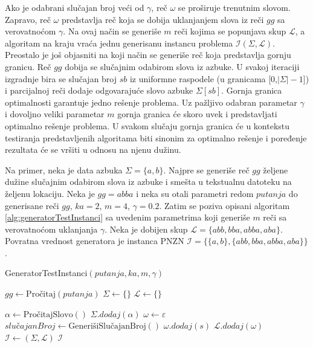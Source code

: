 \documentclass[12pt,oneside]{memoir}
\begin{document}
Ako je odabrani slučajan broj veći od $\gamma$, reč $\omega$ se proširuje
trenutnim slovom. Zapravo, reč $\omega$ predstavlja reč koja se dobija uklanjanjem slova iz 
reči $gg$ sa verovatnoćom $\gamma$.
Na ovaj način se generiše $m$ reči kojima se popunjava skup $\mathcal{L}$, a algoritam
na kraju vraća jednu generisanu instancu problema $\mathcal{I}(\Sigma,\mathcal{L})$.
Preostalo je još objasniti na koji način se generiše reč koja predstavlja gornju granicu.
Reč $gg$ dobija se slučajnim odabirom slova iz azbuke. U svakoj iteraciji 
izgradnje bira se slučajan broj $sb$ iz uniformne
raspodele (u granicama [0,$|\Sigma|-1$]) i parcijalnoj reči dodaje 
odgovarajuće slovo azbuke $\Sigma[sb]$.
Gornja granica optimalnosti garantuje jedno rešenje problema. Uz pažljivo odabran parametar
$\gamma$ i dovoljno veliki parametar $m$ gornja granica će skoro uvek i predstavljati
optimalno rešenje problema. U svakom slučaju gornja granica će u kontekstu testiranja
predstavljenih algoritama biti sinonim za optimalno rešenje i poređenje rezultata će se
vršiti u odnosu na njenu dužinu.

Na primer, neka je data azbuka $\Sigma=\{a,b\}$. Najpre se generiše reč $gg$ željene
dužine slučajnim odabirom slova iz azbuke i smešta u tekstualnu datoteku 
na željenu lokaciju. Neka je $gg=abba$ i neka su otali parametri redom
$putanja$ do generisane reči $gg$, $ka=2$, $m=4$, $\gamma=0.2$.
Zatim se poziva opisani algoritam \ref{alg:generatorTestInstanci} sa uvedenim
parametrima koji generiše $m$ reči sa verovatnoćom uklanjanja $\gamma$. Neka je dobijen skup
$\mathcal{L}=\{abb,bba,abba,aba\}$. Povratna vrednost generatora je instanca PNZN
$\mathcal{I}=\{\{a,b\}, \{abb,bba,abba,aba\}\}$.
\begin{algorithm}
  \caption{\textrm{GeneratorTestInstanci}$(putanja,ka,m,\gamma)$}
  \label{alg:generatorTestInstanci}
  \begin{algorithmic}[1]
  \State $gg \gets \textrm{Pročitaj}(putanja)$ 
  \State $\Sigma \gets \{\}$
  \State $\mathcal{L} \gets \{\}$
  \State

    \State $\alpha \gets \textrm{PročitajSlovo}()$
    \State $\Sigma .dodaj(\alpha)$
  \EndFor
  \State
    \State $\omega \gets \varepsilon$
      \State $slu\textrm{č}ajanBroj \gets \textrm{GenerišiSlučajanBroj}()$
        \State $\omega .dodaj(s)$
      \EndIf
    \EndFor
    \State
    \State $\mathcal{L} .dodaj(\omega)$
    \State
  \EndFor
  \State
  \State $\mathcal{I} \gets (\Sigma,\mathcal{L})$
  \State
  \State \Return $\mathcal{I}$
  \end{algorithmic}
  \end{algorithm}
\end{document}
